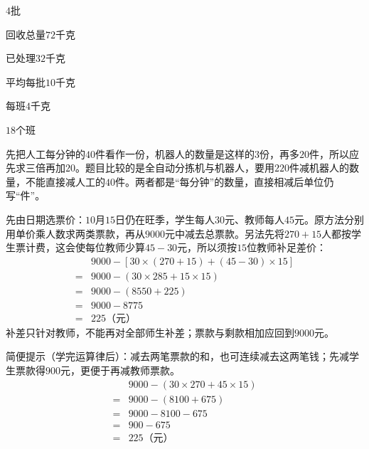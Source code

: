 \documentclass[multi=snippet,border=0pt]{standalone}
\newenvironment{snippet}[3]{\begin{minipage}{#1bp}\color{answerred}\fontsize{#2}{#3}\selectfont\raggedright}{\end{minipage}}
\begin{document}
\begin{snippet}{69.29999999999998}{8.5}{12.8}\(4\)批\end{snippet}
\begin{snippet}{72.29999999999995}{8.5}{12.8}回收总量\(72\)千克\end{snippet}
\begin{snippet}{69.29999999999995}{8.5}{12.8}已处理\(32\)千克\end{snippet}
\begin{snippet}{69.54999999999998}{8.5}{12.8}平均每批\(10\)千克\end{snippet}
\begin{snippet}{72.79999999999995}{8.5}{12.8}每班\(4\)千克\end{snippet}
\begin{snippet}{69.04999999999995}{8.5}{12.8}\(18\)个班\end{snippet}
\begin{snippet}{505}{11.5}{14}先把人工每分钟的\(40\)件看作一份，机器人的数量是这样的\(3\)份，再多\(20\)件，所以应先求三倍再加\(20\)。题目比较的是全自动分拣机与机器人，要用\(220\)件减机器人的数量，不能直接减人工的\(40\)件。两者都是“每分钟”的数量，直接相减后单位仍写“件”。\end{snippet}
\begin{snippet}{505}{11.5}{14}先由日期选票价：\(10\)月\(15\)日仍在旺季，学生每人\(30\)元、教师每人\(45\)元。原方法分别用单价乘人数求两类票款，再从\(9000\)元中减去总票款。另法先将\(270+15\)人都按学生票计费，这会使每位教师少算\(45-30\)元，所以须按\(15\)位教师补足差价：\[\begin{aligned}&9000-[30\times(270+15)+(45-30)\times15]\\={}&9000-(30\times285+15\times15)\\={}&9000-(8550+225)\\={}&9000-8775\\={}&225\text{（元）}\end{aligned}\]补差只针对教师，不能再对全部师生补差；票款与剩款相加应回到\(9000\)元。\par 简便提示（学完运算律后）：减去两笔票款的和，也可连续减去这两笔钱；先减学生票款得\(900\)元，更便于再减教师票款。\[\begin{aligned}&9000-(30\times270+45\times15)\\={}&9000-(8100+675)\\={}&9000-8100-675\\={}&900-675\\={}&225\text{（元）}\end{aligned}\]\end{snippet}
\end{document}
